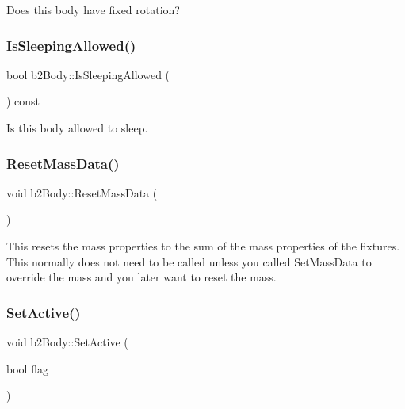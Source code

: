 Does this body have fixed rotation? 

\mbox{\label{classb2_body_ac47251de3a8c0ccff620be7bd5ae696a}} 
\subsubsection{\texorpdfstring{IsSleepingAllowed()}{IsSleepingAllowed()}}
{\footnotesize\ttfamily bool b2\+Body\+::\+Is\+Sleeping\+Allowed (\begin{DoxyParamCaption}{ }\end{DoxyParamCaption}) const\hspace{0.3cm}{\ttfamily [inline]}}



Is this body allowed to sleep. 

\mbox{\label{classb2_body_a109d8567c6ae84c61fce2919fb209c63}} 
\subsubsection{\texorpdfstring{ResetMassData()}{ResetMassData()}}
{\footnotesize\ttfamily void b2\+Body\+::\+Reset\+Mass\+Data (\begin{DoxyParamCaption}{ }\end{DoxyParamCaption})}

This resets the mass properties to the sum of the mass properties of the fixtures. This normally does not need to be called unless you called Set\+Mass\+Data to override the mass and you later want to reset the mass. \mbox{\label{classb2_body_ab8059b7b3e3b64aee17b54f68f7dde80}} 
\subsubsection{\texorpdfstring{SetActive()}{SetActive()}}
{\footnotesize\ttfamily void b2\+Body\+::\+Set\+Active (\begin{DoxyParamCaption}\item[{bool}]{flag }\end{DoxyParamCaption})}

